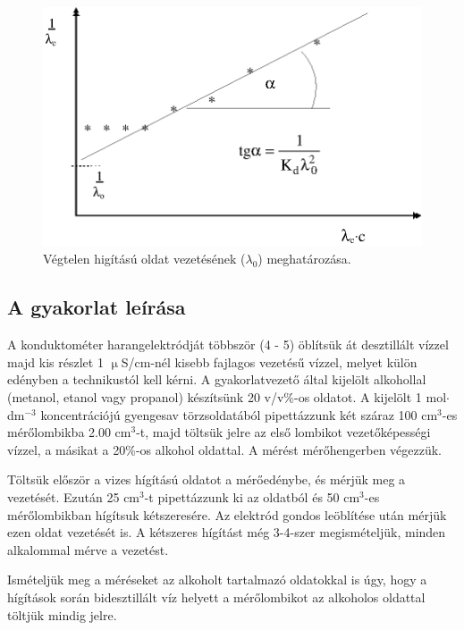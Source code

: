 \begin{figure}
\centering
\includegraphics{lambda0.eps}
\caption{Végtelen higítású oldat vezetésének ($\lambda_0$) meghatározása.}
\label{fig:}
\end{figure}

\subsection{A gyakorlat leírása}

A konduktométer harangelektródját többször (4 - 5) öblítsük át desztillált vízzel majd kis részlet 1 $\upmu$S/cm-nél kisebb fajlagos vezetésű vízzel, melyet külön edényben a technikustól kell kérni.
A gyakorlatvezető által kijelölt alkohollal (metanol, etanol vagy propanol) készítsünk 20 v/v\%-os oldatot.
A kijelölt 1 mol$\cdot$dm$^{-3}$ koncentrációjú gyengesav törzsoldatából pipettázzunk két száraz 100 cm$^3$-es mérőlombikba 2.00 cm$^3$-t, majd töltsük jelre az első lombikot vezetőképességi vízzel, a másikat a 20\%-os alkohol oldattal.
A mérést mérőhengerben végezzük.

Töltsük először a vizes hígítású oldatot a mérőedénybe, és mérjük meg a vezetését.
Ezután 25 cm$^3$-t pipettázzunk ki az oldatból és 50 cm$^3$-es mérőlombikban hígítsuk kétszeresére.
Az elektród gondos leöblítése után mérjük ezen oldat vezetését is.
A kétszeres hígítást még 3-4-szer megismételjük, minden alkalommal mérve a vezetést.

Ismételjük meg a méréseket az alkoholt tartalmazó oldatokkal is úgy, hogy a hígítások során bidesztillált víz helyett a mérőlombikot az alkoholos oldattal töltjük mindig jelre.

